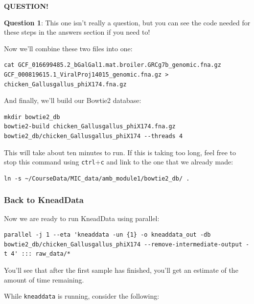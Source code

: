 \documentclass[
]{book}
\newenvironment{bluebox}{
  \definecolor{shadecolor}{RGB}{172, 210, 237}
  \color{white}
  \begin{shaded}}
 {\end{shaded}}
\begin{document}
\begin{bluebox}

\begin{center}
\textbf{QUESTION!}

\end{center}

\textbf{Question 1}: This one isn't really a question, but you can see the code needed for these steps in the answers section if you need to!

\end{bluebox}

Now we'll combine these two files into one:

\begin{verbatim}
cat GCF_016699485.2_bGalGal1.mat.broiler.GRCg7b_genomic.fna.gz GCF_000819615.1_ViralProj14015_genomic.fna.gz > chicken_Gallusgallus_phiX174.fna.gz
\end{verbatim}

And finally, we'll build our Bowtie2 database:

\begin{verbatim}
mkdir bowtie2_db
bowtie2-build chicken_Gallusgallus_phiX174.fna.gz bowtie2_db/chicken_Gallusgallus_phiX174 --threads 4
\end{verbatim}

This will take about ten minutes to run. If this is taking too long, feel free to stop this command using \texttt{ctrl}+\texttt{c} and link to the one that we already made:

\begin{verbatim}
ln -s ~/CourseData/MIC_data/amb_module1/bowtie2_db/ .
\end{verbatim}

\subsubsection{Back to KneadData}\label{back-to-kneaddata}

Now we are ready to run KneadData using parallel:

\begin{verbatim}
parallel -j 1 --eta 'kneaddata -un {1} -o kneaddata_out -db bowtie2_db/chicken_Gallusgallus_phiX174 --remove-intermediate-output -t 4' ::: raw_data/*
\end{verbatim}

You'll see that after the first sample has finished, you'll get an estimate of the amount of time remaining.

While \texttt{kneaddata} is running, consider the following:
\end{document}

